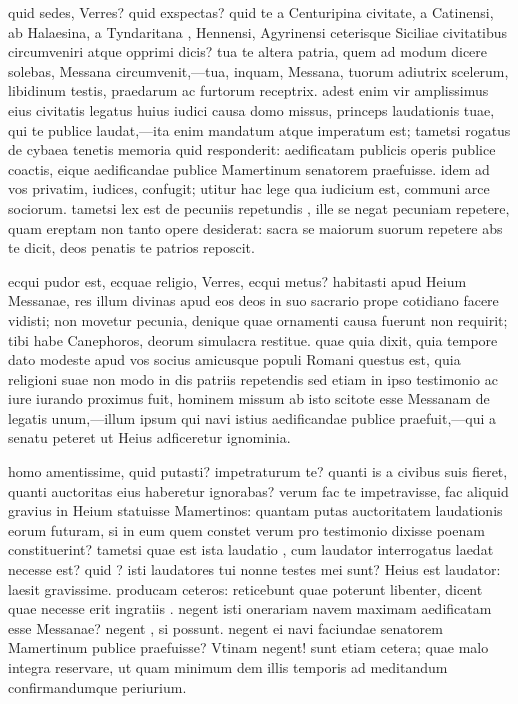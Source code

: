  quid sedes, Verres? quid exspectas? quid te a Centuripina civitate, a Catinensi, ab Halaesina, a Tyndaritana , Hennensi, Agyrinensi ceterisque Siciliae civitatibus circumveniri atque opprimi dicis? tua te altera patria, quem ad modum dicere solebas, Messana circumvenit,—tua, inquam, Messana, tuorum adiutrix scelerum, libidinum testis, praedarum ac furtorum receptrix. adest enim vir amplissimus eius civitatis legatus huius iudici causa domo missus, princeps laudationis tuae, qui te publice laudat,—ita enim mandatum atque imperatum est; tametsi rogatus de cybaea tenetis memoria quid responderit: aedificatam publicis operis publice coactis, eique aedificandae publice Mamertinum senatorem praefuisse. idem ad vos privatim, iudices, confugit; utitur hac lege qua iudicium est, communi arce sociorum. tametsi lex est de pecuniis repetundis , ille se negat pecuniam repetere, quam ereptam non tanto opere desiderat: sacra se maiorum suorum repetere abs te dicit, deos penatis te patrios reposcit.

 ecqui pudor est, ecquae religio, Verres, ecqui metus? habitasti apud Heium Messanae, res illum divinas apud eos deos in suo sacrario prope cotidiano facere vidisti; non movetur pecunia, denique quae ornamenti causa fuerunt non requirit; tibi habe Canephoros, deorum simulacra restitue. quae quia dixit, quia tempore dato modeste apud vos socius amicusque populi Romani questus est, quia religioni suae non modo in dis patriis repetendis sed etiam in ipso testimonio ac iure iurando proximus fuit, hominem missum ab isto scitote esse Messanam de legatis unum,—illum ipsum qui navi istius aedificandae publice praefuit,—qui a senatu peteret ut Heius adficeretur ignominia.

 homo amentissime, quid putasti? impetraturum te? quanti is a civibus suis fieret, quanti auctoritas eius haberetur ignorabas? verum fac te impetravisse, fac aliquid gravius in Heium statuisse Mamertinos: quantam putas auctoritatem laudationis eorum futuram, si in eum quem constet verum pro testimonio dixisse poenam constituerint? tametsi quae est ista laudatio , cum laudator interrogatus laedat necesse est? quid ? isti laudatores tui nonne testes mei sunt? Heius est laudator: laesit gravissime. producam ceteros: reticebunt quae poterunt libenter, dicent quae necesse erit ingratiis . negent isti onerariam navem maximam aedificatam esse Messanae? negent , si possunt. negent ei navi faciundae senatorem Mamertinum publice praefuisse? Vtinam negent! sunt etiam cetera; quae malo integra reservare, ut quam minimum dem illis temporis ad meditandum confirmandumque periurium.

